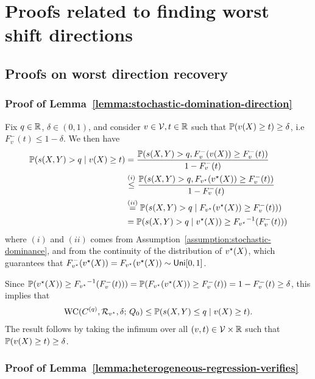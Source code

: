 
\section{Proofs related to finding worst shift directions}
\label{sec:worst-shift-proofs}

\subsection{Proofs on worst direction recovery}

\subsubsection{Proof of Lemma~\ref{lemma:stochastic-domination-direction}}
\label{sec:proof-stochastic-domination-direction}

Fix $q \in \R$, $\delta \in (0,1)$, and consider $v \in \mc{V},  t \in \R$ such that $\P( v(X) \ge t) \ge \delta$, i.e $F_v^-(t) \le 1-\delta$.  We then have
\begin{align*}
\P( \score(X,Y) > q \mid v(X) \ge t )  &= \dfrac{ \P( \score(X,Y) > q,   F_v^-(v(X)) \ge F_v^-(t))}{1 - F_v^-(t)} \\
&\overset{(i)}{\le} \dfrac{ \P( \score(X,Y) > q,   F_{v\opt}(v\opt(X)) \ge F_v^-(t))}{1 - F_v^-(t)} \\
&\overset{(ii)}{=}  \P( \score(X,Y) > q \mid  F_{v\opt}(v\opt(X)) \ge F_v^-(t))) \\
&= \P( \score(X,Y) > q \mid  v\opt(X)) \ge {F_{v\opt}}^{-1}(F_v^-(t)))
\end{align*}
where $(i)$ and $(ii)$ comes from Assumption~\ref{assumption:stochastic-dominance},  and from the continuity of the distribution of $v\opt(X)$,  which guarantees that $  F_{v\opt}^-(v\opt(X)) = F_{v\opt}(v\opt(X)) \sim \uniform[0,1]$.

Since $\P(v\opt(X)) \ge {F_{v\opt}}^{-1}(F_v^-(t))) =  \P( F_{v\opt}(v\opt(X)) \ge F_v^-(t)) = 1 - F_v^-(t) \ge \delta$, this implies that
\begin{align*}
  \wc(C^{(q)}, \mc{R}_{v\opt}, \delta; \, Q_0) \le
  \P( \score(X,Y) \le q \mid v(X) \ge t ).
\end{align*}
The result follows by taking the infimum over all $(v, t) \in \mc{V}
\times \R$ such that $\P( v(X) \ge t) \ge \delta$.

\subsubsection{Proof of Lemma~\ref{lemma:heterogeneous-regression-verifies}}
\label{sec:proof-heterogeneous-regression-verifies}

